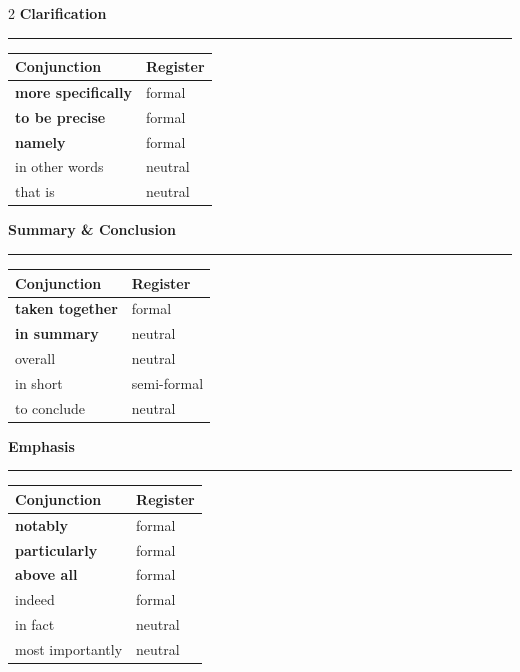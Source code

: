 \documentclass[11pt,a4paper]{article}
\newcommand{\sectionheading}[1]{%
  \vspace{6pt}%
  {\color{konstanzblue}\large\textbf{#1}}\\[-4pt]%
  {\color{konstanzblue}\rule{\linewidth}{1.5pt}}%
  \vspace{2pt}%
}
\begin{document}
\begin{multicols}{2}
\vspace{10pt}
\sectionheading{Clarification}
\begin{tabular}{@{}ll@{}}
\toprule
\textbf{Conjunction} & \textbf{Register} \\
\midrule
\textbf{more specifically} & formal \\
\textbf{to be precise} & formal \\
\textbf{namely} & formal \\
in other words & neutral \\
that is & neutral \\
\bottomrule
\end{tabular}

\vspace{10pt}
\sectionheading{Summary \& Conclusion}
\begin{tabular}{@{}ll@{}}
\toprule
\textbf{Conjunction} & \textbf{Register} \\
\midrule
\textbf{taken together} & formal \\
\textbf{in summary} & neutral \\
overall & neutral \\
in short & semi-formal \\
to conclude & neutral \\
\bottomrule
\end{tabular}

\vspace{10pt}
\sectionheading{Emphasis}
\begin{tabular}{@{}ll@{}}
\toprule
\textbf{Conjunction} & \textbf{Register} \\
\midrule
\textbf{notably} & formal \\
\textbf{particularly} & formal \\
\textbf{above all} & formal \\
indeed & formal \\
in fact & neutral \\
most importantly & neutral \\
\bottomrule
\end{tabular}

\end{multicols}
\end{document}
